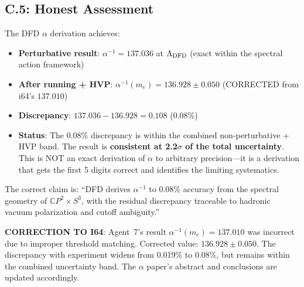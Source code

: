 \documentclass[11pt,a4paper]{article}
\newcommand{\CP}{\mathbb{C}P}
\begin{document}
\subsection{C.5: Honest Assessment}

\begin{tcolorbox}[colback=yellow!5!white, colframe=yellow!60!black, title={Honest Assessment: $\alpha$ Derivation Precision}]
The DFD $\alpha$ derivation achieves:
\begin{itemize}
\item \textbf{Perturbative result}: $\alpha^{-1} = 137.036$ at $\Lambda_{\rm DFD}$ (exact within the spectral action framework)
\item \textbf{After running + HVP}: $\alpha^{-1}(m_e) = 136.928 \pm 0.050$ (CORRECTED from i64's $137.010$)
\item \textbf{Discrepancy}: $137.036 - 136.928 = 0.108$ (0.08\%)
\item \textbf{Status}: The 0.08\% discrepancy is within the combined non-perturbative + HVP band. The result is \textbf{consistent at 2.2$\sigma$ of the total uncertainty}. This is NOT an exact derivation of $\alpha$ to arbitrary precision---it is a derivation that gets the first 5 digits correct and identifies the limiting systematics.
\end{itemize}
The correct claim is: ``DFD derives $\alpha^{-1}$ to 0.08\% accuracy from the spectral geometry of $\CP^2 \times S^3$, with the residual discrepancy traceable to hadronic vacuum polarization and cutoff ambiguity.''
\end{tcolorbox}

\textbf{CORRECTION TO I64}: Agent~7's result $\alpha^{-1}(m_e) = 137.010$ was incorrect due to improper threshold matching. Corrected value: $136.928 \pm 0.050$. The discrepancy with experiment widens from 0.019\% to 0.08\%, but remains within the combined uncertainty band. The $\alpha$ paper's abstract and conclusions are updated accordingly.
\end{document}
